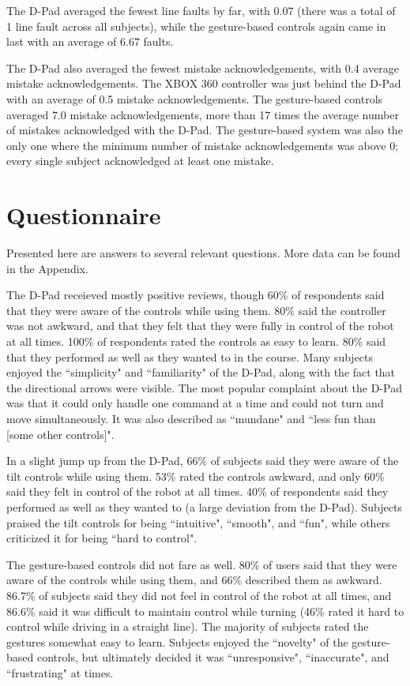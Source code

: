 \documentclass[12pt, letterpaper]{report}
\begin{document}
The D-Pad averaged the fewest line faults by far, with 0.07 (there was a total of 1 line fault across all subjects), while the gesture-based controls again came in last with an average of 6.67 faults.

The D-Pad also averaged the fewest mistake acknowledgements, with 0.4 average mistake acknowledgements. The XBOX 360 controller was just behind the D-Pad with an average of 0.5 mistake acknowledgements. The gesture-based controls averaged 7.0 mistake acknowledgements, more than 17 times the average number of mistakes acknowledged with the D-Pad. The gesture-based system was also the only one where the minimum number of mistake acknowledgements was above 0; every single subject acknowledged at least one mistake.

\section{Questionnaire}
Presented here are answers to several relevant questions. More data can be found in the Appendix.

The D-Pad receieved mostly positive reviews, though 60\% of respondents said that they were aware of the controls while using them. 80\% said the controller was not awkward, and that they felt that they were fully in control of the robot at all times. 100\% of respondents rated the controls as easy to learn. 80\% said that they performed as well as they wanted to in the course. Many subjects enjoyed the ``simplicity" and ``familiarity" of the D-Pad, along with the fact that the directional arrows were visible. The most popular complaint about the D-Pad was that it could only handle one command at a time and could not turn and move simultaneously. It was also described as ``mundane" and ``less fun than [some other controls]".

In a slight jump up from the D-Pad, 66\% of subjects said they were aware of the tilt controls while using them. 53\% rated the controls awkward, and only 60\% said they felt in control of the robot at all times. 40\% of respondents said they performed as well as they wanted to (a large deviation from the D-Pad). Subjects praised the tilt controls for being ``intuitive", ``smooth", and ``fun", while others criticized it for being ``hard to control".

The gesture-based controls did not fare as well. 80\% of users said that they were aware of the controls while using them, and 66\% described them as awkward. 86.7\% of subjects said they did not feel in control of the robot at all times, and 86.6\% said it was difficult to maintain control while turning (46\% rated it hard to control while driving in a straight line). The majority of subjects rated the gestures somewhat easy to learn. Subjects enjoyed the ``novelty" of the gesture-based controls, but ultimately decided it was ``unresponsive", ``inaccurate", and ``frustrating" at times.
\end{document}
